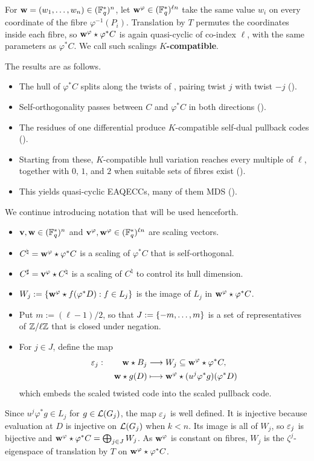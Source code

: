 \documentclass[twocolumn, 11pt]{scrartcl}
\begin{document}
For $\mathbf{w}=(w_1,\hdots,w_n)\in(\mathbb{F}_q^*)^n$, let $\mathbf{w}^\varphi\in(\mathbb{F}_q^*)^{\ell n}$ take the same value $w_i$ on every coordinate of the fibre $\varphi^{-1}(P_i)$. Translation by $T$ permutes the coordinates inside each fibre, so $\mathbf{w}^\varphi\star \varphi^*C$ is again quasi-cyclic of co-index $\ell$, with the same parameters as $\varphi^*C$. We call such scalings \textbf{$K$-compatible}.

The results are as follows.
\begin{itemize}
    \item The hull of $\varphi^*C$ splits along the twists of , pairing twist $j$ with twist $-j$ ().
    \item Self-orthogonality passes between $C$ and $\varphi^*C$ in both directions ().
    \item The residues of one differential produce $K$-compatible self-dual pullback codes ().
    \item Starting from these, $K$-compatible hull variation reaches every multiple of $\ell$, together with $0$, $1$, and $2$ when suitable sets of fibres exist ().
    \item This yields quasi-cyclic EAQECCs, many of them MDS ().
\end{itemize}

We continue introducing notation that will be used henceforth.
\begin{itemize}
    \item $\mathbf{v},\mathbf{w}\in(\mathbb{F}_q^*)^n$ and $\mathbf{v}^\varphi,\mathbf{w}^\varphi\in(\mathbb{F}_q^*)^{\ell n}$ are scaling vectors.
    \item $C^\natural=\mathbf{w}^\varphi\star\varphi^*C$ is a scaling of $\varphi^*C$ that is self-orthogonal.
    \item $C^\sharp=\mathbf{v}^\varphi\star C^\natural$ is a scaling of $C^\natural$ to control its hull dimension.
    \item $W_j:=\{\mathbf{w}^\varphi\star f(\varphi^*D):f\in L_j\}$ is the image of $L_j$ in $\mathbf{w}^\varphi\star\varphi^*C$.
    \item Put $m:=(\ell-1)/2$, so that $J:=\{-m,\hdots,m\}$ is a set of representatives of $\mathbb{Z}/\ell\mathbb{Z}$ that is closed under negation.
    \item For $j\in J$, define the map
        \begin{alignat*}{2}
        \varepsilon_j:\;&&\mathbf{w}\star B_j&\longrightarrow W_j\subseteq\mathbf{w}^\varphi\star\varphi^*C,\\
        &&\mathbf{w}\star g(D)&\longmapsto\mathbf{w}^\varphi\star(u^j\varphi^*g)(\varphi^*D)
        \end{alignat*}
        which embeds the scaled twisted code into the scaled pullback code.
\end{itemize}
Since $u^j\varphi^*g\in L_j$ for $g\in\mathcal{L}(G_j)$, the map $\varepsilon_j$ is well defined. It is injective because evaluation at $D$ is injective on $\mathcal{L}(G_j)$ when $k<n$. Its image is all of $W_j$, so $\varepsilon_j$ is bijective and $\mathbf{w}^\varphi\star \varphi^*C=\bigoplus_{j\in J}W_j$. As $\mathbf{w}^\varphi$ is constant on fibres, $W_j$ is the $\zeta^j$-eigenspace of translation by $T$ on $\mathbf{w}^\varphi\star\varphi^*C$.
\end{document}

